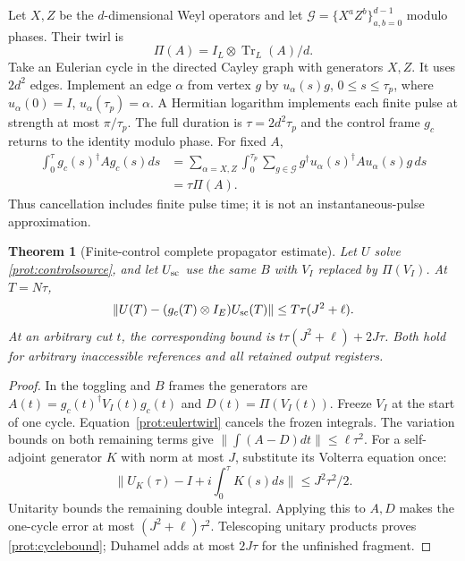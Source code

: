 \documentclass[11pt,oneside,openany]{book}
\newtheorem{theorem}{Theorem}[chapter]
\theoremstyle{definition}
\theoremstyle{remark}\newtheorem{remark}[theorem]{Remark}
\begin{document}
Let $X,Z$ be the $d$-dimensional Weyl operators and let $\mathcal G=\{X^aZ^b\}_{a,b=0}^{d-1}$ modulo phases. Their twirl is
\[
 \Pi(A)=I_L\otimes\operatorname{Tr}_L(A)/d.
\]
Take an Eulerian cycle in the directed Cayley graph with generators $X,Z$. It uses $2d^2$ edges. Implement an edge $\alpha$ from vertex $g$ by $u_\alpha(s)g$, $0\le s\le\tau_p$, where $u_\alpha(0)=I$, $u_\alpha(\tau_p)=\alpha$. A Hermitian logarithm implements each finite pulse at strength at most $\pi/\tau_p$. The full duration is $\tau=2d^2\tau_p$ and the control frame $g_c$ returns to the identity modulo phase. For fixed $A$,
\begin{align}
 \int_0^\tau g_c(s)^\dagger A g_c(s)ds
 &=\sum_{\alpha=X,Z}\int_0^{\tau_p}
       \sum_{g\in\mathcal G}g^\dagger u_\alpha(s)^\dagger A u_\alpha(s)g\,ds\\
 &=\tau\Pi(A).
 \label{prot:eulertwirl}
\end{align}
Thus cancellation includes finite pulse time; it is not an instantaneous-pulse approximation.

\begin{theorem}[Finite-control complete propagator estimate]
\label{prot:controlbound}
Let $U$ solve \eqref{prot:controlsource}, and let $U_{\rm sc}$ use the same $B$ with $V_I$ replaced by $\Pi(V_I)$. At $T=N\tau$,
\begin{equation}
 \|U(T)-(g_c(T)\otimes I_E)U_{\rm sc}(T)\|
          \le T\tau(J^2+\ell).
 \label{prot:cyclebound}
\end{equation}
At an arbitrary cut $t$, the corresponding bound is
$t\tau(J^2+\ell)+2J\tau$. Both hold for arbitrary inaccessible references and all retained output registers.
\end{theorem}
\begin{proof}
In the toggling and $B$ frames the generators are
$A(t)=g_c(t)^\dagger V_I(t)g_c(t)$ and $D(t)=\Pi(V_I(t))$. Freeze $V_I$ at the start of one cycle. Equation~\eqref{prot:eulertwirl} cancels the frozen integrals. The variation bounds on both remaining terms give
$\|\int(A-D)dt\|\le\ell\tau^2$.
For a self-adjoint generator $K$ with norm at most $J$, substitute its Volterra equation once:
\[
 \|U_K(\tau)-I+i\int_0^\tau K(s)ds\|\le J^2\tau^2/2.
\]
Unitarity bounds the remaining double integral. Applying this to $A,D$ makes the one-cycle error at most $(J^2+\ell)\tau^2$. Telescoping unitary products proves \eqref{prot:cyclebound}; Duhamel adds at most $2J\tau$ for the unfinished fragment.
\end{proof}
\end{document}
